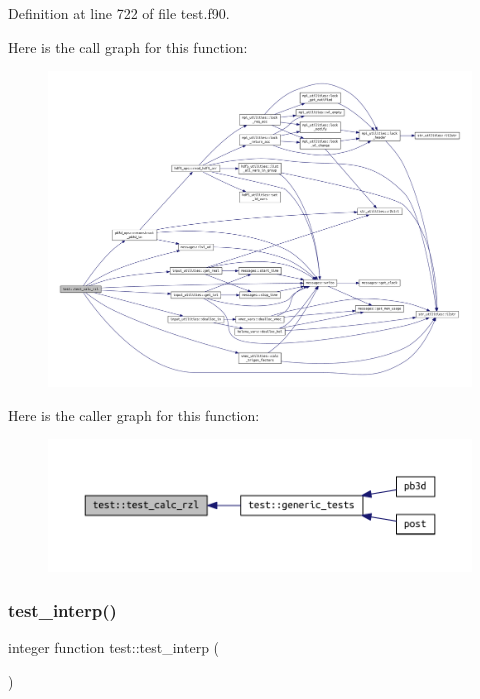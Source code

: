 Definition at line 722 of file test.\+f90.

Here is the call graph for this function\+:
\nopagebreak
\begin{figure}[H]
\begin{center}
\leavevmode
\includegraphics[width=350pt]{namespacetest_a4a25e64af6b986091f9e49ba447fc5c4_cgraph}
\end{center}
\end{figure}
Here is the caller graph for this function\+:
\nopagebreak
\begin{figure}[H]
\begin{center}
\leavevmode
\includegraphics[width=350pt]{namespacetest_a4a25e64af6b986091f9e49ba447fc5c4_icgraph}
\end{center}
\end{figure}
\mbox{\label{namespacetest_af72aaa5773b5bef2ac8d25fd05378439}} 
\subsubsection{\texorpdfstring{test\+\_\+interp()}{test\_interp()}}
{\footnotesize\ttfamily integer function test\+::test\+\_\+interp (\begin{DoxyParamCaption}{ }\end{DoxyParamCaption})}



